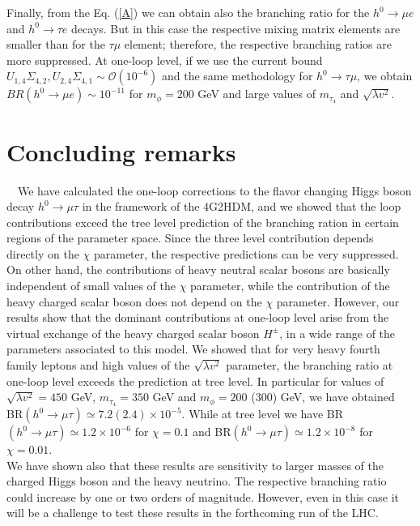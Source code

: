 \documentclass[a4paper]{jpconf}
\begin{document}
Finally, from the Eq. (\ref{A}) we can obtain also the branching ratio for the $h^0\to \mu e$ and $h^0\to \tau e$ decays. But in this case the respective mixing matrix elements are smaller than for the $\tau\mu$ element; therefore, the respective branching ratios are more suppressed. At one-loop level, if we use the current bound $U_{1,4}\Sigma_{4,2},U_{2,4}\Sigma_{4,1}\sim \mathcal{O}(10^{-6})$
\cite{BarShalom:2011bb} and the same methodology for $h^0\to \tau\mu$, we obtain $BR(h^0\to \mu e)\sim 10^{-11}$ for $m_\phi=200$ GeV and large values of $m_{\tau_4}$ and $\sqrt{\lambda v^2}$.

\section{Concluding remarks}
\ \
We have calculated the one-loop corrections to the flavor changing Higgs boson decay $h^0\to \mu \tau$ in the framework of the 4G2HDM, and we showed that the loop contributions exceed the tree level prediction of the branching ration in certain regions of the parameter space. Since the three level contribution depends directly on the $\chi$ parameter, the respective predictions can be very suppressed. On other hand, the contributions of heavy neutral scalar bosons are basically independent of small values of the $\chi$ parameter, while the contribution of the heavy charged scalar boson does not depend on the $\chi$ parameter. However, our results show that the dominant contributions at one-loop level arise from the virtual exchange of the heavy charged scalar boson $H^\pm$, in a wide range of the parameters associated to this model. We showed that for very heavy fourth family leptons and high values of the $\sqrt{\lambda v^{2}}$ parameter, the branching ratio at one-loop level exceeds the prediction at tree level. In particular for values of $\sqrt{\lambda v^2}=450$ GeV, $m_{\tau_4}=350$ GeV and $m_\phi=200$ (300) GeV, we have obtained BR$(h^0\to \mu\tau)\simeq 7.2(2.4)\times 10^{-5}$. While at tree level we have
BR$(h^0\to \mu\tau)\simeq 1.2\times10^{-6}$ for $\chi=0.1$ and BR$(h^0\to \mu\tau)\simeq 1.2\times10^{-8}$ for $\chi=0.01$.\\
 We have shown also that these results are sensitivity to larger masses of the charged Higgs boson and the heavy neutrino. The respective branching ratio could increase by one or two orders of magnitude. However,
even in this case it will be a challenge to test these results in the forthcoming run of the LHC.\\
\end{document}
